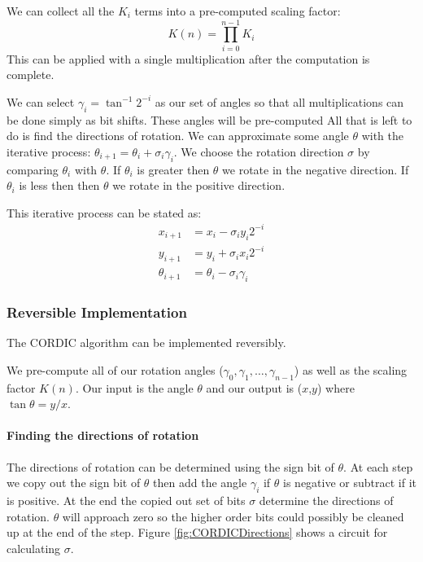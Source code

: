         We can collect all the $K_i$ terms into a pre-computed scaling factor:
        \[ K(n) = \prod_{i=0}^{n-1}K_i \]
        This can be applied with a single multiplication after the computation is complete.

        We can select $\gamma_i = \tan^{-1}2^{-i}$ as our set of angles so that all multiplications can be done simply as bit shifts.
        These angles will be pre-computed
        All that is left to do is find the directions of rotation.
        We can approximate some angle $\theta$ with the iterative process: $\theta_{i+1} = \theta_i + \sigma_i\gamma_i$.
        We choose the rotation direction $\sigma$ by comparing $\theta_i$ with $\theta$.
        If $\theta_i$ is greater then $\theta$ we rotate in the negative direction.
        If $\theta_i$ is less then then $\theta$ we rotate in the positive direction.

        This iterative process can be stated as:
        \begin{equation}\label{eq:cordIter}
            \begin{aligned}
                x_{i+1}      &= x_i - \sigma_iy_i2^{-i}\\
                y_{i+1}      &= y_i + \sigma_ix_i2^{-i}\\
                \theta_{i+1} &= \theta_i - \sigma_i\gamma_i
            \end{aligned}
        \end{equation}

    \subsubsection{Reversible Implementation}

    The CORDIC algorithm can be implemented reversibly.

	We pre-compute all of our rotation angles
	($\gamma_0,\gamma_1,\dotsc,\gamma_{n-1}$) as well as the scaling factor
	$K(n)$. Our input is the angle $\theta$ and our output is ($x$,$y$)
	where $\tan\theta = y/x$.

	\paragraph{Finding the directions of rotation} The directions of
	rotation can be determined using the sign bit of $\theta$.  At each step we
	copy out the sign bit of $\theta$ then add the angle $\gamma_i$ if $\theta$ is
	negative or subtract if it is positive.  At the end the copied out set of bits
	$\sigma$ determine the directions of rotation.  $\theta$ will approach zero so
	the higher order bits could possibly be cleaned up at the end of the step.
	Figure \ref{fig:CORDICDirections} shows a circuit for calculating $\sigma$.

